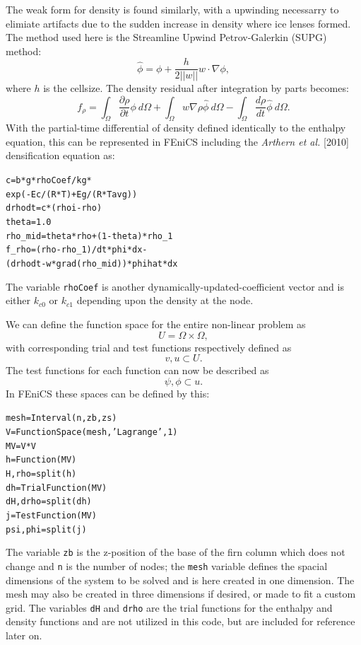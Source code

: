 \documentclass{article}%
\begin{document}
The weak form for density is found similarly, with a upwinding necessarry to elimiate artifacts due to the sudden increase in density where ice lenses formed.  The method used here is the Streamline Upwind Petrov-Galerkin (SUPG) method:
  $$
    \hat{\phi} = \phi + \frac{h}{2||w||} w \cdot \nabla{\phi},
  $$
where $h$ is the cellsize.  The density residual after integration by parts becomes:
  $$
  f_{\rho} = 
    \int_{\Omega} \frac{\partial \rho}{\partial t}\phi\ d \Omega + 
    \int_{\Omega} w\nabla \rho \hat{\phi}\ d \Omega -
    \int_{\Omega}\frac{d \rho}{dt}\hat{\phi}\ d \Omega.
  $$
With the partial-time differential of density defined identically to the enthalpy equation, this can be represented in FEniCS including the \emph{Arthern et al.} [2010] densification equation as:\par
\footnotesize
\begin{alltt}
c       = b*g*rhoCoef/kg * 
          exp(-Ec/(R*T) + Eg/(R*Tavg))
drhodt  = c*(rhoi - rho)
theta   = 1.0
rho_mid = theta*rho + (1 - theta)*rho_1
f_rho   = (rho - rho_1)/dt*phi*dx - 
          (drhodt - w*grad(rho_mid))*phihat*dx
\end{alltt}
\normalsize
The variable \texttt{rhoCoef} is another dynamically-updated-coefficient vector and is either $k_{c0}$ or $k_{c1}$ depending upon the density at the node.

We can define the function space for the entire non-linear problem as 
  $$
    U = \Omega \times \Omega,
  $$
with corresponding trial and test functions respectively defined as
  $$
    v, u \subset U.
  $$
The test functions for each function can now be described as
  $$
    \psi, \phi \subset u.
  $$
In FEniCS these spaces can be defined by this:
\footnotesize
\begin{alltt}
mesh     = Interval(n, zb, zs)
V        = FunctionSpace(mesh, 'Lagrange', 1)
MV       = V*V
h        = Function(MV)
H,rho    = split(h)    
dh       = TrialFunction(MV)
dH, drho = split(dh)
j        = TestFunction(MV)
psi, phi = split(j)
\end{alltt}
\normalsize
The variable \texttt{zb} is the z-position of the base of the firn column which does not change and \texttt{n} is the number of nodes; the \texttt{mesh} variable defines the spacial dimensions of the system to be solved and is here created in one dimension.  The mesh may also be created in three dimensions if desired, or made to fit a custom grid.  The variables \texttt{dH} and \texttt{drho} are the trial functions for the enthalpy and density functions and are not utilized in this code, but are included for reference later on.
\end{document}
